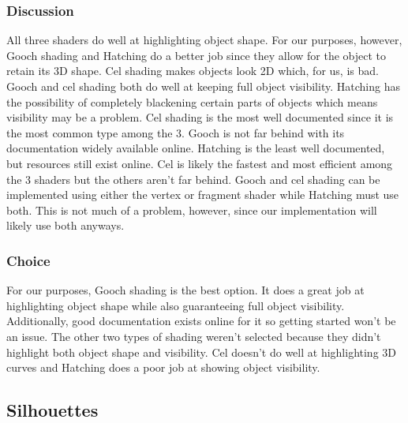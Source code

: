 \documentclass[10pt,journal,compsoc,draftclsnofoot]{IEEEtran}
\begin{document}
\subsubsection{Discussion}
All three shaders do well at highlighting object shape. 
For our purposes, however, Gooch shading and Hatching do a better job since they allow for the object to retain its 3D shape. 
Cel shading makes objects look 2D which, for us, is bad.
Gooch and cel shading both do well at keeping full object visibility. 
Hatching has the possibility of completely blackening certain parts of objects which means visibility may be a problem.
Cel shading is the most well documented since it is the most common type among the 3. 
Gooch is not far behind with its documentation widely available online.
Hatching is the least well documented, but resources still exist online.
Cel is likely the fastest and most efficient among the 3 shaders but the others aren't far behind.
Gooch and cel shading can be implemented using either the vertex or fragment shader while Hatching must use both.
This is not much of a problem, however, since our implementation will likely use both anyways.

\subsubsection{Choice}
For our purposes, Gooch shading is the best option. 
It does a great job at highlighting object shape while also guaranteeing full object visibility. 
Additionally, good documentation exists online for it so getting started won't be an issue.
The other two types of shading weren't selected because they didn't highlight both object shape and visibility.
Cel doesn't do well at highlighting 3D curves and Hatching does a poor job at showing object visibility.

\newpage

\subsection{Silhouettes}
\end{document}
